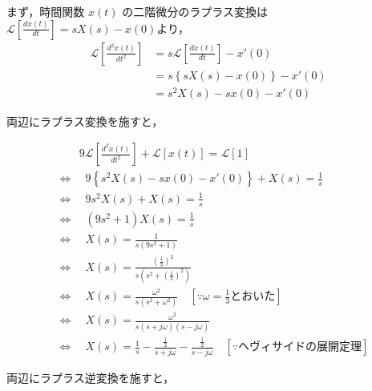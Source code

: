 \documentclass[a4paper,12pt]{article}
\begin{document}
\begin{tcolorbox}[title={[12] つぎの微分方程式をラプラス変換を用いて解け.
  \[
      9 \frac{d^2 x(t)}{dt^2} + x(t) = 1 
  \]
  \quad ただし，初期値は，$x(0) = 0,\ x'(0) = 0$ とする．
  }]

  \quad まず，時間関数 \( x(t) \) の二階微分のラプラス変換は\( \mathcal{L} \left[ \frac{dx(t)}{dt} \right] = sX(s) - x(0) \)より，
    \vspace{-3mm}
    \begin{align*}
        \mathcal{L} \left[ \frac{d^2x(t)}{dt^2} \right] 
        &= s \mathcal{L} \left[ \frac{dx(t)}{dt} \right] - x'(0) \\
        &= s \left\{ sX(s) - x(0) \right\} - x'(0) \\
        &= s^2 X(s) - s x(0) - x'(0)
    \end{align*}


\newpage

\quad 両辺にラプラス変換を施すと，

\vspace{-6mm}

\begin{align*}
    &\qquad 9 \mathcal{L} \left[ \frac{d^2 x(t)}{dt^2} \right] + \mathcal{L}[x(t)] = \mathcal{L}[1] \\
    &\Leftrightarrow \quad 9\left\{s^2 X(s) - s x(0) - x'(0)\right\} + X(s) = \frac{1}{s} \\
    &\Leftrightarrow \quad 9s^2 X(s) + X(s) = \frac{1}{s} \\
    &\Leftrightarrow \quad (9s^2 + 1) X(s) = \frac{1}{s} \\
    &\Leftrightarrow \quad X(s) = \frac{1}{s(9s^2 + 1)} \\
    &\Leftrightarrow \quad X(s)= \frac{(\frac{1}{3})^2}{s(s^2 + \left( \frac{1}{3} \right)^2)} \\
    &\Leftrightarrow \quad X(s)= \frac{\omega^2}{s(s^2 + \omega^2)} \quad \left[\because \omega = \frac{1}{3} \text{とおいた}\right]\\
    &\Leftrightarrow \quad X(s)= \frac{\omega^2}{s(s + j \omega)(s - j \omega)} \\
    &\Leftrightarrow \quad X(s)= \frac{1}{s} - \frac{\frac{1}{2}}{s + j \omega} - \frac{\frac{1}{2}}{s - j \omega} \quad \left[ \because ヘヴィサイドの展開定理 \right]
\end{align*}

\quad 両辺にラプラス逆変換を施すと，

\vspace{-6mm}


\end{tcolorbox}
\end{document}

